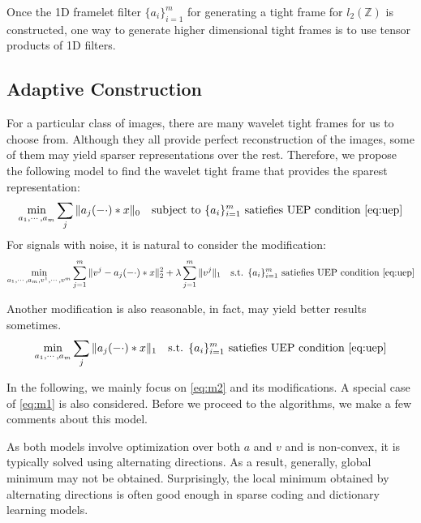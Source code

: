 \documentclass[a4paper]{article}
\begin{document}
Once the 1D framelet filter $\{a_i\}_{i=1}^m$ for generating a tight frame for $l_2(\mathbb{Z})$ is constructed, one way to generate higher dimensional tight frames is to use tensor products of 1D filters.


\subsection{Adaptive Construction}
For a particular class of images, there are many wavelet tight frames for us to choose from. Although they all provide perfect reconstruction of the images, some of them may yield sparser representations over the rest. Therefore, we propose the following model to find the wavelet tight frame that provides the sparest representation:
\begin{equation}
	\min_{a_1,\cdots,a_m} \sum_j \|a_j(-\cdot)*x\|_0 \quad \textrm{subject to } \{a_i\}_{i=1}^m \textrm{ satiefies UEP condition \eqref{eq:uep}}
\end{equation}
For signals with noise, it is natural to consider the modification:
\begin{equation}
\label{eq:m1}
	\min_{a_1,\cdots,a_m,v^1,\cdots,v^m}  \sum_{j=1}^m \|v^j - a_j(-\cdot)*x\|_2^2 + \lambda \sum_{j=1}^m \|v^j\|_1 \quad \textrm{s.t. } \{a_i\}_{i=1}^m \textrm{ satiefies UEP condition \eqref{eq:uep}}
\end{equation}

Another modification is also reasonable, in fact, may yield better results sometimes.
\begin{equation}
\label{eq:m2}
	\min_{a_1,\cdots,a_m}  \sum_j \|a_j(-\cdot)*x\|_1 \quad \textrm{s.t. } \{a_i\}_{i=1}^m \textrm{ satiefies UEP condition \eqref{eq:uep}}
\end{equation}

In the following, we mainly focus on \eqref{eq:m2} and its modifications. A special case of \eqref{eq:m1} is also considered.
Before we proceed to the algorithms, we make a few comments about this model. 

As both models involve optimization over both $a$ and $v$ and is non-convex, it is typically solved using alternating directions. As a result, generally, global minimum may not be obtained. Surprisingly, the local minimum obtained by alternating directions is often good enough in sparse coding and dictionary  learning models.
\end{document}
